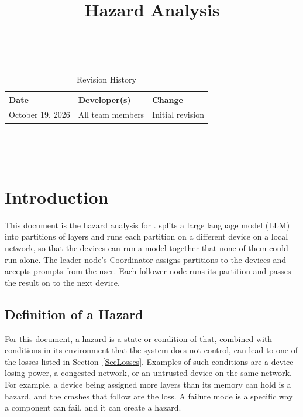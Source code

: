 \documentclass{article}
\title{Hazard Analysis\\\progname}
\author{\authname}
\date{}
\begin{document}
\maketitle
\thispagestyle{empty}

~\newpage


\begin{table}[hp]
\caption{Revision History} \label{TblRevisionHistory}
\begin{tabularx}{\textwidth}{llX}
\toprule
\textbf{Date} & \textbf{Developer(s)} & \textbf{Change}\\
\midrule
October 19, 2026 & All team members & Initial revision \\
\bottomrule
\end{tabularx}
\end{table}

~\newpage

\tableofcontents

\listoftables

\listoffigures

~\newpage


\section{Introduction}

This document is the hazard analysis for \progname{}. \progname{} splits a
large language model (LLM) into partitions of layers and runs each partition
on a different device on a local network, so that the devices can run a model
together that none of them could run alone. The leader node's Coordinator
assigns partitions to the devices and accepts prompts from the user. Each
follower node runs its partition and passes the result on to the next
device.

\subsection{Definition of a Hazard}

For this document, a hazard is a state or condition of \progname{}
that, combined with conditions in its environment that the system does not
control, can lead to one of the losses listed in
Section~\ref{SecLosses}. Examples of such conditions are a device losing
power, a congested network, or an untrusted device on the same network. For
example, a device being assigned more layers than its memory can hold is a
hazard, and the crashes that follow are the loss. A failure mode is a
specific way a component can fail, and it can create a hazard.
\end{document}
